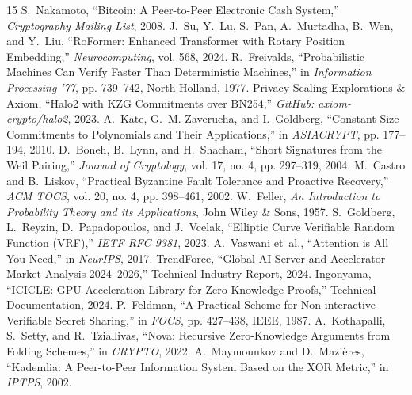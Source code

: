 \documentclass[10pt,twocolumn,letterpaper]{article}
\begin{document}
\begin{thebibliography}{15}
 S.~Nakamoto, ``Bitcoin: A Peer-to-Peer Electronic Cash System,'' \emph{Cryptography Mailing List}, 2008.
 J.~Su, Y.~Lu, S.~Pan, A.~Murtadha, B.~Wen, and Y.~Liu, ``RoFormer: Enhanced Transformer with Rotary Position Embedding,'' \emph{Neurocomputing}, vol. 568, 2024.
 R.~Freivalds, ``Probabilistic Machines Can Verify Faster Than Deterministic Machines,'' in \emph{Information Processing '77}, pp. 739--742, North-Holland, 1977.
 Privacy Scaling Explorations \& Axiom, ``Halo2 with KZG Commitments over BN254,'' \emph{GitHub: axiom-crypto/halo2}, 2023.
 A.~Kate, G.~M. Zaverucha, and I.~Goldberg, ``Constant-Size Commitments to Polynomials and Their Applications,'' in \emph{ASIACRYPT}, pp. 177--194, 2010.
 D.~Boneh, B.~Lynn, and H.~Shacham, ``Short Signatures from the Weil Pairing,'' \emph{Journal of Cryptology}, vol. 17, no. 4, pp. 297--319, 2004.
 M.~Castro and B.~Liskov, ``Practical Byzantine Fault Tolerance and Proactive Recovery,'' \emph{ACM TOCS}, vol. 20, no. 4, pp. 398--461, 2002.
 W.~Feller, \emph{An Introduction to Probability Theory and its Applications}, John Wiley \& Sons, 1957.
 S.~Goldberg, L.~Reyzin, D.~Papadopoulos, and J.~Vcelak, ``Elliptic Curve Verifiable Random Function (VRF),'' \emph{IETF RFC 9381}, 2023.
 A.~Vaswani et~al., ``Attention is All You Need,'' in \emph{NeurIPS}, 2017.
 TrendForce, ``Global AI Server and Accelerator Market Analysis 2024--2026,'' Technical Industry Report, 2024.
 Ingonyama, ``ICICLE: GPU Acceleration Library for Zero-Knowledge Proofs,'' Technical Documentation, 2024.
 P.~Feldman, ``A Practical Scheme for Non-interactive Verifiable Secret Sharing,'' in \emph{FOCS}, pp. 427--438, IEEE, 1987.
 A.~Kothapalli, S.~Setty, and R.~Tziallivas, ``Nova: Recursive Zero-Knowledge Arguments from Folding Schemes,'' in \emph{CRYPTO}, 2022.
 A.~Maymounkov and D.~Mazi{\`e}res, ``Kademlia: A Peer-to-Peer Information System Based on the XOR Metric,'' in \emph{IPTPS}, 2002.
\end{thebibliography}
\end{document}
